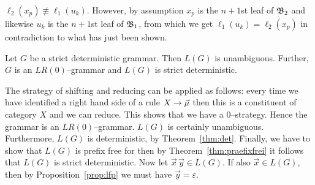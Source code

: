 $\ell_2(x_p) \not\equiv \ell_1(u_k)$. However, by assumption $x_p$
is the $n+1$st leaf of $\mathfrak{B}_2$ and likewise $u_k$ is the $n+1$st
leaf of $\mathfrak{B}_1$, from which we get $\ell_1(u_k) = \ell_2(x_p)$ in
contradiction to what has just been shown. \proofend
\begin{thm}
Let $G$ be a strict deterministic grammar. Then $L(G)$ is
unambiguous. Further, $G$ is an $LR(0)$--grammar and $L(G)$ is
strict deterministic.
\end{thm}
\proofbeg 
The strategy of shifting and reducing can be applied as
follows: every time we have identified a right hand side of a rule
$X \rightarrow \vec{\mu}$ then this is a constituent of category $X$ and
we can reduce. This shows that we have a $0$--strategy. Hence the
grammar is an $LR(0)$--grammar. $L(G)$ is certainly unambiguous.
Furthermore, $L(G)$ is deterministic, by Theorem~\ref{thm:det}.
Finally, we have to show that $L(G)$ is prefix free for then by
Theorem~\ref{thm:praefixfrei} it follows that $L(G)$ is strict
deterministic. Now let $\vec{x}\, \vec{y} \in L(G)$.  If also
$\vec{x} \in L(G)$, then by Proposition~\ref{prop:lfp} we must
have $\vec{y} = \varepsilon$. \proofend

